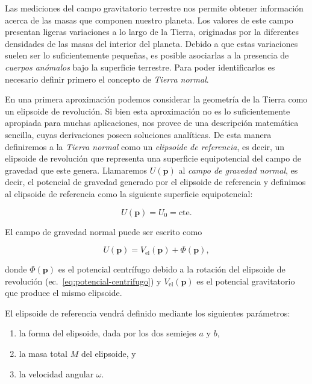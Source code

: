 Las mediciones del campo gravitatorio terrestre nos permite obtener información
acerca de las masas que componen nuestro planeta. Los valores de este campo
presentan ligeras variaciones a lo largo de la Tierra, originadas por la
diferentes densidades de las masas del interior del planeta. Debido a que estas
variaciones suelen ser lo suficientemente pequeñas, es posible asociarlas a la
presencia de \emph{cuerpos anómalos} bajo la superficie terrestre. Para poder
identificarlos es necesario definir primero el concepto de \emph{Tierra
normal}.

En una primera aproximación podemos considerar la geometría de la Tierra como
un elipsoide de revolución. Si bien esta aproximación no es lo suficientemente
apropiada para muchas aplicaciones, nos provee de una descripción matemática
sencilla, cuyas derivaciones poseen soluciones analíticas.
De esta manera definiremos a la \emph{Tierra normal} como un \emph{elipsoide de
referencia}, es decir, un elipsoide de revolución que representa una superficie
equipotencial del campo de gravedad que este genera. Llamaremos $U(\mathbf{p})$
al \emph{campo de gravedad normal}, es decir, el potencial de gravedad generado
por el elipsoide de referencia y definimos al elipsoide de referencia como la
siguiente superficie equipotencial:

\begin{equation}
    U(\mathbf{p}) = U_0 = \text{cte}.
\end{equation}

El campo de gravedad normal puede ser escrito como

\begin{equation}
    U(\mathbf{p}) = V_\text{el}(\mathbf{p}) + \Phi(\mathbf{p}),
\end{equation}

\noindent donde $\Phi(\mathbf{p})$ es el potencial centrífugo debido a la
rotación del elipsoide de revolución (ec.~\ref{eq:potencial-centrifugo})
y $V_\text{el}(\mathbf{p})$ es el potencial gravitatorio que produce el mismo
elipsoide.

El elipsoide de referencia vendrá definido mediante los siguientes parámetros:

\begin{enumerate}
    \item{la forma del elipsoide, dada por los dos semiejes $a$ y $b$,}
    \item{la masa total $M$ del elipsoide, y}
    \item{la velocidad angular $\omega$.}
\end{enumerate}

